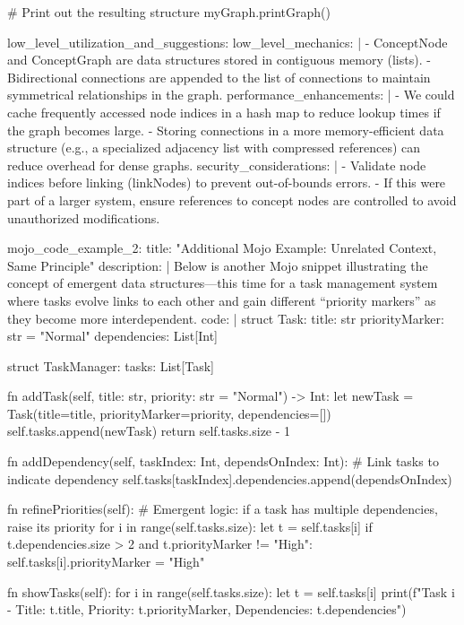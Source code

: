         # Print out the resulting structure
        myGraph.printGraph()

  low_level_utilization_and_suggestions:
    low_level_mechanics: |
      - ConceptNode and ConceptGraph are data structures stored in contiguous memory (lists).
      - Bidirectional connections are appended to the list of connections to maintain symmetrical relationships in the graph.
    performance_enhancements: |
      - We could cache frequently accessed node indices in a hash map to reduce lookup times if the graph becomes large.
      - Storing connections in a more memory-efficient data structure (e.g., a specialized adjacency list with compressed references) can reduce overhead for dense graphs.
    security_considerations: |
      - Validate node indices before linking (linkNodes) to prevent out-of-bounds errors.
      - If this were part of a larger system, ensure references to concept nodes are controlled to avoid unauthorized modifications.

mojo_code_example_2:
  title: "Additional Mojo Example: Unrelated Context, Same Principle"
  description: |
    Below is another Mojo snippet illustrating the concept of emergent data structures—this time for a task management system where tasks evolve links to each other and gain different “priority markers” as they become more interdependent.
  code: |
    struct Task:
        title: str
        priorityMarker: str = "Normal"
        dependencies: List[Int]

    struct TaskManager:
        tasks: List[Task]

        fn addTask(self, title: str, priority: str = "Normal") -> Int:
            let newTask = Task(title=title, priorityMarker=priority, dependencies=[])
            self.tasks.append(newTask)
            return self.tasks.size - 1

        fn addDependency(self, taskIndex: Int, dependsOnIndex: Int):
            # Link tasks to indicate dependency
            self.tasks[taskIndex].dependencies.append(dependsOnIndex)

        fn refinePriorities(self):
            # Emergent logic: if a task has multiple dependencies, raise its priority
            for i in range(self.tasks.size):
                let t = self.tasks[i]
                if t.dependencies.size > 2 and t.priorityMarker != "High":
                    self.tasks[i].priorityMarker = "High"

        fn showTasks(self):
            for i in range(self.tasks.size):
                let t = self.tasks[i]
                print(f"Task {i} - Title: {t.title}, Priority: {t.priorityMarker}, Dependencies: {t.dependencies}")

